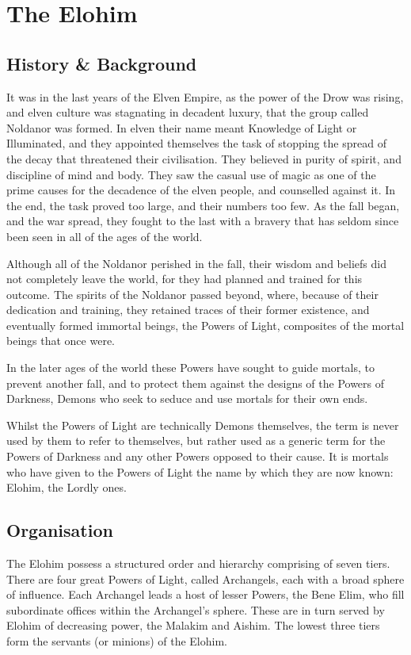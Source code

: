 \section{The Elohim}

\subsection{History \& Background}

It was in the last years of the Elven Empire, as the power of the Drow
was rising, and elven culture was stagnating in decadent luxury, that
the group called Noldanor was formed. In elven their name meant
Knowledge of Light or Illuminated, and they appointed themselves the
task of stopping the spread of the decay that threatened their
civilisation. They believed in purity of spirit, and discipline of
mind and body. They saw the casual use of magic as one of the prime
causes for the decadence of the elven people, and counselled against
it. In the end, the task proved too large, and their numbers too
few. As the fall began, and the war spread, they fought to the last
with a bravery that has seldom since been seen in all of the ages of
the world.

Although all of the Noldanor perished in the fall, their wisdom and
beliefs did not completely leave the world, for they had planned and
trained for this outcome. The spirits of the Noldanor passed beyond,
where, because of their dedication and training, they retained traces
of their former existence, and eventually formed immortal beings, the
Powers of Light, composites of the mortal beings that once were.

In the later ages of the world these Powers have sought to guide
mortals, to prevent another fall, and to protect them against the
designs of the Powers of Darkness, Demons who seek to seduce and use
mortals for their own ends.

Whilst the Powers of Light are technically Demons themselves, the term
is never used by them to refer to themselves, but rather used as a
generic term for the Powers of Darkness and any other Powers opposed
to their cause. It is mortals who have given to the Powers of Light
the name by which they are now known: Elohim, the Lordly ones.

\subsection{Organisation}

The Elohim possess a structured order and hierarchy comprising of
seven tiers. There are four great Powers of Light, called Archangels,
each with a broad sphere of influence. Each Archangel leads a host of
lesser Powers, the Bene Elim, who fill subordinate offices within the
Archangel's sphere. These are in turn served by Elohim of decreasing
power, the Malakim and Aishim. The lowest three tiers form the
servants (or minions) of the Elohim.


